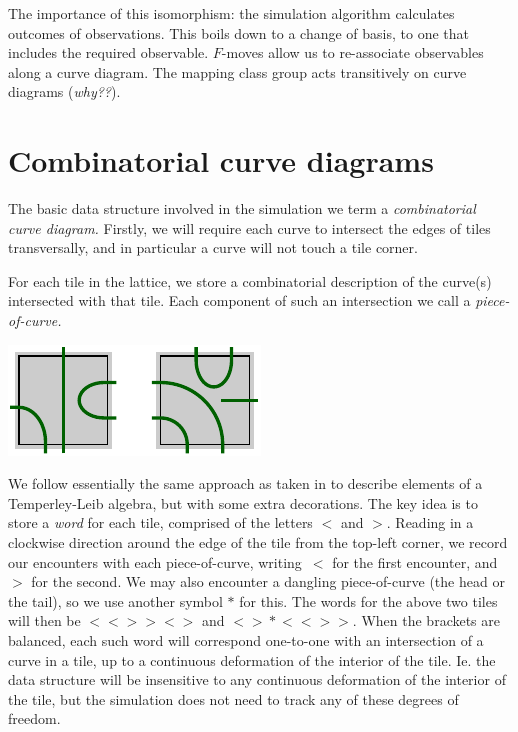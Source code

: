 \documentclass[aps, prl, letterpaper, twocolumn, superscriptaddress, notitlepage, 10pt]{revtex4-1}
\begin{document}
The importance of this isomorphism: the simulation
algorithm calculates outcomes of observations. This
boils down to a change of basis, to one that includes
the required observable.
$F$-moves allow us to re-associate observables along
a curve diagram. The mapping class group acts
transitively on curve diagrams (\emph{why??}).

%
%

\section{Combinatorial curve diagrams}

The basic data structure involved in the
simulation we term a \emph{combinatorial curve
diagram.}
Firstly, we will require each curve to intersect 
the edges of tiles transversally,
and in particular a curve will not touch a tile corner.

For each tile in the lattice,
we store a combinatorial
description of the curve(s) intersected with that tile.
Each component of such an intersection we call a \emph{piece-of-curve.}
\begin{center}
\includegraphics[]{pic-cells.pdf}
\end{center}

We follow essentially the same approach as taken in \cite{Abramsky2007} 
to describe elements of a Temperley-Leib algebra, but
with some extra decorations.
The key idea is to store a \emph{word} for each tile, comprised of
the letters $\bigl<$ and $\bigr>$.
Reading in a clockwise direction around the edge of
the tile from the top-left corner,
we record our encounters with each piece-of-curve,
writing~$\bigl<$ for the first encounter, and~$\bigr>$ for the
second.
We may also encounter a dangling piece-of-curve
(the head or the tail), so we use another symbol $*$ for this.
The words for the above two tiles will then be 
$\bigl<\bigl<\bigr>\bigr>\bigl<\bigr>$ and $\bigl<\bigr>*\bigl<\bigl<\bigr>\bigr>.$
When the brackets are balanced,
each such word will correspond one-to-one with an intersection
of a curve in a tile, up to a continuous deformation of the interior of the tile.
Ie. the data structure 
will be insensitive to any continuous deformation of the interior of the tile,
but the simulation does not need to track any of these degrees of freedom.
\end{document}
